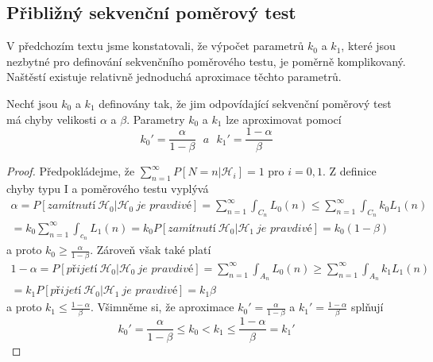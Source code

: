 \subsection{Přibližný sekvenční poměrový test}

V předchozím textu jsme konstatovali, že výpočet parametrů $k_0$ a $k_1$, které jsou nezbytné pro definování sekvenčního poměrového testu, je poměrně komplikovaný. Naštěstí existuje relativně jednoduchá aproximace těchto parametrů.

\begin{corollary}
Nechť jsou $k_0$ a $k_1$ definovány tak, že jim odpovídající sekvenční poměrový test má chyby velikosti $\alpha$ a $\beta$. Parametry $k_0$ a $k_1$ lze aproximovat pomocí
\begin{equation*}
k_0' = \frac{\alpha}{1 - \beta} ~~~ \textit{a} ~~~ k_1' = \frac{1 - \alpha}{\beta}
\end{equation*}
\end{corollary}

\begin{proof}
Předpokládejme, že $\sum_{n = 1}^{\infty} P[N = n|\mathscr{H}_i] = 1$ pro $i = 0, 1$. Z definice chyby typu I a poměrového testu vyplývá
\begin{multline*}
\alpha = P[\textit{zamítnutí} ~ \mathscr{H}_0 | \mathscr{H}_0 ~ \textit{je pravdivé}] = \sum_{n = 1}^{\infty} \int_{C_n}L_0(n) \le \sum_{n = 1}^{\infty} \int_{C_n} k_0 L_1(n)\\
= k_0 \sum_{n = 1}^{\infty} \int_{c_n} L_1(n) = k_0 P[\textit{zamítnutí} ~ \mathscr{H}_0 | \mathscr{H}_1 ~ \textit{je pravdivé}] = k_0 (1 - \beta)
\end{multline*}
a proto $k_0 \ge \frac{\alpha}{1 - \beta}$. Zároveň však také platí
\begin{multline*}
1 - \alpha = P[\textit{přijetí} ~ \mathscr{H}_0 | \mathscr{H}_0 ~ \textit{je pravdivé}] = \sum_{n = 1}^{\infty} \int_{A_n} L_0(n) \ge \sum_{n = 1}^{\infty} \int_{A_n} k_1 L_1(n)\\
= k_1 P[\textit{přijetí} ~ \mathscr{H}_0 | \mathscr{H}_1 ~ \textit{je pravdivé}] = k_1 \beta
\end{multline*}
a proto $k_1 \le \frac{1 - \alpha}{\beta}$. Všimněme si, že aproximace $k_0' = \frac{\alpha}{1 - \beta}$ a $k_1' = \frac{1 - \alpha}{\beta}$ splňují
\begin{equation*}
k_0' = \frac{\alpha}{1 - \beta} \le k_0 < k_1 \le \frac{1 - \alpha}{\beta} = k_1'
\end{equation*}
\end{proof}


